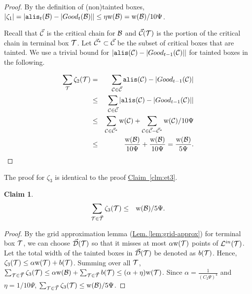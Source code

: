 \documentclass{acmsmall}
\newtheorem{claim}[theorem]{Claim}
\newcommand{\cB}{{\cal B}}
\newcommand{\cC}{{\cal C}}
\newcommand{\cD}{{\cal D}}
\newcommand{\cL}{{\cal L}}
\newcommand{\cT}{{\cal T}}
\newcommand{\Lem}[1]{\hyperref[lem:#1]{Lem.\,\ref*{lem:#1}}} %
\newcommand{\Clm}[1]{\hyperref[clm:#1]{Claim~\ref*{clm:#1}}} %
\newcommand{\alis}{{\tt alis}}
\newcommand{\gridprecval}{\frac{1}{(C_2\errorcont)^4}}
\newcommand{\taint}{\eta}
\newcommand{\taintval}{1/10\errorcont}
\newcommand{\width}{{\bf {\rm  w}}}
\newcommand{\gridprec}{\alpha}
\newcommand{\errorcont}{\Psi}
\newcommand{\errorterm}{\zeta}
\begin{document}
\begin{proof}
By the definition of (non)tainted boxes, $|\errorterm_1| = |\alis_t(\cB)-|Good_t(\cB)|| \leq \taint \width(\cB) = \width(\cB)/10\errorcont$.

Recall that $\vec{\cC}$ is the critical chain for $\cB$ and $\vec{\cC}(\cT)$ is the portion of the critical chain in terminal box $\cT$.
Let $\vec{\cC}^*\subset \vec{\cC}$ be the subset of critical boxes that are tainted.
We use a trivial bound for $|\alis(\cC)-|Good_{t-1}(\cC)||$ for tainted boxes in the following.

\begin{eqnarray*}
\sum_\cT \errorterm_2(\cT) & = & \sum_{\cC \in \vec{\cC}} \alis(\cC)-|Good_{t-1}(\cC)|\\
& \leq & \sum_{\cC \in \vec{\cC}} |\alis(\cC)-|Good_{t-1}(\cC)||\\
& \leq	& \sum_{\cC \in \vec{\cC}^*}\width(\cC) + \sum_{\cC \in \vec{\cC}-\vec{\cC}^*} \width(\cC)/10\errorcont\\
& \leq &  \frac{\width(\cB)}{10\errorcont} + \frac{\width(\cB)}{10\errorcont} =  \frac{\width(\cB)}{5\errorcont}.
\end{eqnarray*}
\end{proof}
 
The proof for $\errorterm_3$ is identical to the proof \Clm{et3}.

\begin{claim}
\label{clm:et3imp} 
\begin{eqnarray*}
\sum_{\cT \in \vec{\cT}} \errorterm_3(\cT)
& \leq & \width(\cB)/5\errorcont.
\end{eqnarray*}
\end{claim}
%
\begin{proof}
By the grid approximation lemma (\Lem{grid-approx}) for terminal box $\cT$, we can choose $\vec{\cD}(\cT)$ so that it misses at most
$\gridprec\width(\cT)$ points of $\cL^{in}(\cT)$. Let the total width of the tainted boxes in $\vec{\cD}(\cT)$ be denoted as $b(\cT)$.
Hence, $\errorterm_3(\cT) \leq \gridprec\width(\cT) + b(\cT)$. Summing over all $\cT$, 
$\sum_{\cT \in \vec{\cT}} \errorterm_3(\cT) \leq \gridprec\width(\cB) + \sum_{\cT \in \vec{\cT}} b(\cT) \leq (\gridprec + \taint)\width(\cT)$.
Since $\gridprec = \gridprecval$ and $\taint = \taintval$, $\sum_{\cT \in \vec{\cT}} \errorterm_3(\cT) \leq \width(\cB)/5\errorcont$.
\end{proof} 
\fi
\end{document}
